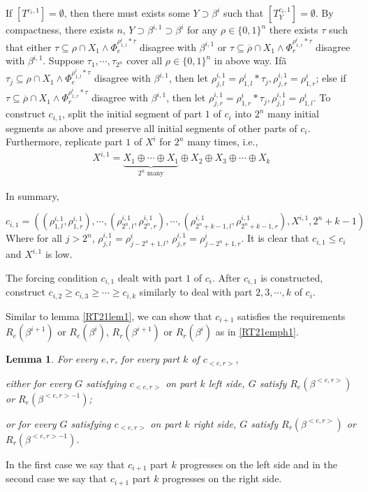 \documentclass[options]{amsart}
\newtheorem{lemma}[theorem]{Lemma}
\theoremstyle{definition}
\theoremstyle{remark}
\newtheorem{Ramsey's theorem}[theorem]{Ramsey's theorem}
\begin{document}
If $[T^{c_i,1}]=\emptyset$, then
there must exists some
$Y\supset\beta^i$ such that
$[T^{c_i,1}_Y]=\emptyset$.
By compactness, there exists
$n$,
$Y\supset\beta^{i,1}\supset\beta^i$
for any
$\rho\in \{0,1\}^n$
there exists $\tau$ such that
either
$\tau\subseteq \rho\cap X_{1}
\wedge
\Phi_e^{\rho^i_{1,l}*\tau}
$ disagree with $\beta^{i,1}$
or
$\tau\subseteq \overline{\rho}\cap X_1\wedge
\Phi_r^{\rho^i_{1,r}*\tau}
$ disagree with $\beta^{i,1}$.
Suppose $\tau_1,\cdots,\tau_{2^n}$
cover all $\rho\in\{0,1\}^n$ in above
way.
Ifã$\tau_j\subseteq
\rho\cap X_1\wedge
\Phi_e^{\rho^i_{1,l}*\tau}$
disagree with $\beta^{i,1}$, then
let $\rho^{i,1}_{j,l} =
\rho^i_{1,l}*\tau_j,
\rho^{i,1}_{j,r} = \rho^i_{1,r}$;
else if
$\tau\subseteq \overline{\rho}\cap X_1\wedge
\Phi_r^{\rho^i_{1,r}*\tau}
$ disagree with $\beta^{i,1}$,
then let
$\rho^{i,1}_{j,r} =
\rho^i_{1,r}*\tau_j,
\rho^{i,1}_{j,l} = \rho^i_{1,l}$.
To construct $c_{i,1}$,
split the initial segment of
part $1$ of $c_i$
into $2^n$ many initial segments
as above and preserve all initial
segments of other parts of $c_i$.
Furthermore,  replicate
part $1$  of
$X^i$ for $2^n$ many
times, i.e.,
\begin{align}
X^{i,1}=
\underbrace{X_1\oplus\cdots
\oplus X_1}\limits_{2^n\text{ many}}
\oplus X_2\oplus X_3\oplus\cdots
\oplus X_k
\end{align}

In summary,

$$c_{i,1} =
((\rho^{i,1}_{1,l},
\rho^{i,1}_{1,r}),\cdots,
(\rho^{i,1}_{2^n,l},
\rho^{i,1}_{2^n,r}),
\cdots,(\rho^{i,1}_{2^n+k-1,l},
\rho^{i,1}_{2^n+k-1,r}),
X^{i,1}, 2^n+k-1)$$
Where for all $j>2^n$,
$\rho^{i,1}_{j,l}
=\rho^{i}_{j-2^n+1,l}$,
$\rho^{i,1}_{j,r}
=\rho^i_{j-2^n+1,r}$.
It is clear that
$c_{i,1}\leq c_i$
and $X^{i,1}$ is low.

The forcing condition
$c_{i,1}$ dealt with
part $1$ of $c_i$.
After
$c_{i,1}$ is constructed,
construct $c_{i,2}\geq
c_{i,3}\geq \cdots \geq
c_{i,k}$ similarly
to deal with part $2,3,\cdots,k$ of
$c_i$.

Similar to lemma \ref{RT21lem1},
 we can show that $c_{i+1}$ satisfies
 the requirements $R_e(\beta^{i+1})$
 or $R_e(\beta^{i})$,
 $R_r(\beta^{i+1})$ or $R_r(\beta^i)$
  as in \ref{RT21emph1}.
\begin{lemma}\label{RT21lem10}
For every $e,r$, for every
part $k$ of $c_{<e,r>}$,

either
for every
$G$ satisfying $c_{<e,r>}$ on
part $k$ left side,
$G$ satisfy $R_e(\beta^{<e,r>})$
or $R_e(\beta^{<e,r>-1})$;

or
for every
$G$ satisfying $c_{<e,r>}$ on
part $k$ right side,
$G$ satisfy $R_r(\beta^{<e,r>})$
or $R_r(\beta^{<e,r>-1})$.

\end{lemma}
In the first case we say that
$c_{i+1}$ part $k$ progresses on the left
side and
 in the second case we say that
 $c_{i+1}$ part $k$ progresses on the right
 side.
\end{document}
